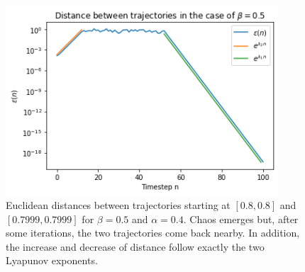 \documentclass[11pt,titlepage]{article}
\begin{document}
\begin{center}
	\begin{figure} [h]
		\centering
		\includegraphics[width = 4in]{./figures/ex3_3.png}
		\caption{Euclidean distances between trajectories starting at $[0.8,0.8]$ and $[0.7999, 0.7999]$ for $\beta=0.5$ and $\alpha=0.4$. Chaos emerges but, after some iterations, the two trajectories come back nearby. In addition, the increase and decrease of distance follow exactly the two Lyapunov exponents.}
		\label{fig19}
	\end{figure}
\end{center}
\end{document}

